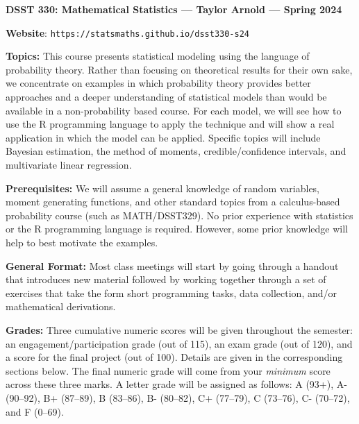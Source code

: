 \documentclass[11pt, a4paper]{article}
\begin{document}
\begin{center}
\textbf{DSST 330: Mathematical Statistics --- Taylor Arnold --- Spring 2024}
\end{center}

\vspace{0.5cm}

\textbf{Website}: \texttt{https://statsmaths.github.io/dsst330-s24}

\bigskip

\textbf{Topics:}
This course presents statistical modeling using the language of
probability theory. Rather than focusing on theoretical results for their
own sake, we concentrate on examples in which probability theory
provides better approaches and a deeper understanding of statistical
models than would be available in a non-probability based course.
For each model, we will see how to use the R programming language to
apply the technique and will show a real application in which the model
can be applied. Specific topics will include Bayesian estimation,
the method of moments, credible/confidence intervals, and multivariate
linear regression.

\bigskip

\textbf{Prerequisites:}
We will assume a general knowledge of random variables, moment generating
functions, and other standard topics from a calculus-based probability
course (such as MATH/DSST329). No prior experience with statistics or the
R programming language is required. However, some prior knowledge will help
to best motivate the examples.

\bigskip

\textbf{General Format:}
Most class meetings will start by going through a handout that
introduces new material followed by working together through a set of
exercises that take the form short programming tasks, data collection,
and/or mathematical derivations.

\bigskip

\textbf{Grades:}
Three cumulative numeric scores will be given throughout the semester:
an engagement/participation grade (out of 115), an exam grade (out of 120),
and a score for the final project (out of 100). Details are given in the
corresponding sections below. The final numeric grade will come from your
\textit{minimum} score across these three marks. A letter grade will be
assigned as follows:
             A (93+), A- (90--92),
B+ (87--89), B (83--86), B- (80--82),
C+ (77--79), C (73--76), C- (70--72), and F (0--69).

\bigskip
\end{document}
